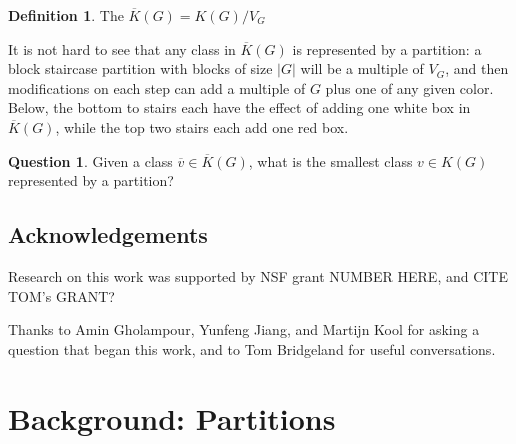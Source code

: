\documentclass{amsart}[12pt]
\theoremstyle{definition}
\newtheorem{definition}[dummy]{Definition}
\newtheorem{question}{Question}
\begin{document}
\begin{definition}
The $\overline{K}(G)=K(G)/V_G$ 
\end{definition}

It is not hard to see that any class in $\overline{K}(G)$ is represented by a partition: a block staircase partition with blocks of size $|G|$ will be a multiple of $V_G$, and then modifications on each step can add a multiple of $G$ plus one of any given color.  Below, the bottom to stairs each have the effect of adding one white box in $\overline{K}(G)$, while the top two stairs each add one red box.



\begin{question}
Given a class $\overline{v}\in \overline{K}(G)$, what is the smallest class $v\in K(G)$ represented by a partition?
\end{question}


\subsection{Acknowledgements}

Research on this work was supported by NSF grant NUMBER HERE, and CITE TOM's GRANT?

Thanks to Amin Gholampour, Yunfeng Jiang, and Martijn Kool for asking a question that began this work, and to Tom Bridgeland for useful conversations.

\section{Background: Partitions}
\end{document}
